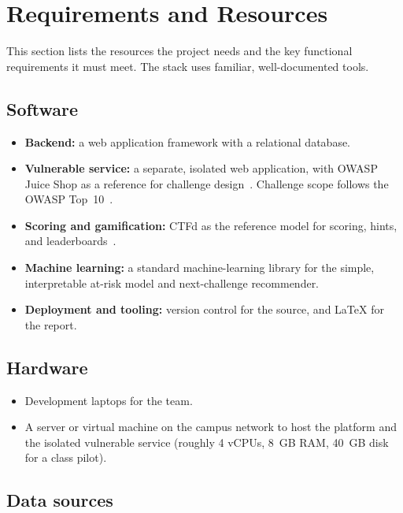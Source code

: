 \section{Requirements and Resources}
\label{sec:requirements}

This section lists the resources the project needs and the key functional
requirements it must meet. The stack uses familiar, well-documented tools.

\subsection{Software}

\begin{itemize}[leftmargin=1.4em,itemsep=0.2em]
\item \textbf{Backend:} a web application framework with a relational database.
\item \textbf{Vulnerable service:} a separate, isolated web application, with
      OWASP Juice Shop as a reference for challenge design~\cite{Owasp_juiceshop}.
      Challenge scope follows the OWASP Top~10~\cite{Owasp2021top10}.
\item \textbf{Scoring and gamification:} CTFd as the reference model for scoring,
      hints, and leaderboards~\cite{Ctfd_docs}.
\item \textbf{Machine learning:} a standard machine-learning library for the simple,
      interpretable at-risk model and next-challenge recommender.
\item \textbf{Deployment and tooling:} version control for the source, and
      \LaTeX{} for the report.
\end{itemize}

\subsection{Hardware}

\begin{itemize}[leftmargin=1.4em,itemsep=0.2em]
\item Development laptops for the team.
\item A server or virtual machine on the campus network to host the platform and the
      isolated vulnerable service (roughly 4 vCPUs, 8~GB RAM, 40~GB disk for a class
      pilot).
\end{itemize}

\subsection{Data sources}


